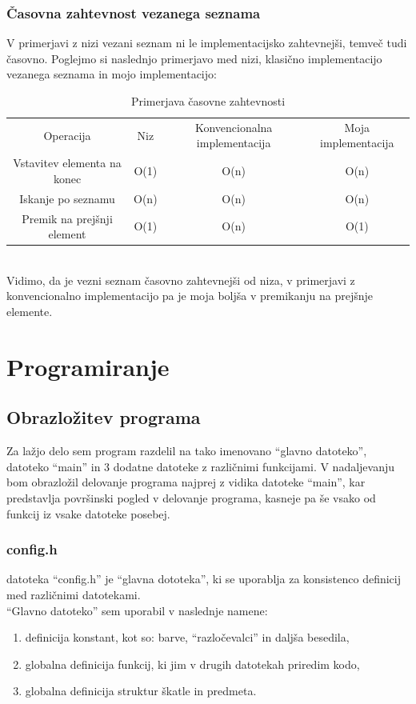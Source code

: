 \documentclass[12pt, a4paper, notitlepage]{article}
\begin{document}
    \subsubsection{Časovna zahtevnost vezanega seznama}
    V primerjavi z nizi vezani seznam ni le implementacijsko zahtevnejši, temveč tudi časovno. Poglejmo si naslednjo primerjavo med nizi, klasično implementacijo vezanega seznama in mojo implementacijo:
    \begin{table}[h!]
    \begin{center}
      \begin{tabular}{ |c|c|c|c| }
        Operacija & Niz & Konvencionalna implementacija & Moja implementacija\\
        Vstavitev elementa na konec & O(1) & O(n) & O(n)\\
        Iskanje po seznamu & O(n) & O(n) & O(n)\\
        Premik na prejšnji element & O(1) & O(n) &O(1)
      \end{tabular}
      \caption{Primerjava časovne zahtevnosti\cite{timecomp_linked_list}}
    \end{center}
    \end{table}
    \\Vidimo, da je vezni seznam časovno zahtevnejši od niza, v primerjavi z konvencionalno implementacijo pa je moja boljša v premikanju na prejšnje elemente.
  \section{Programiranje}
    \subsection{Obrazložitev programa}
    Za lažjo delo sem program razdelil na tako imenovano ``glavno datoteko'', datoteko ``main'' in 3 dodatne datoteke z različnimi funkcijami. V nadaljevanju bom obrazložil delovanje programa najprej z vidika datoteke ``main'', kar predstavlja površinski pogled v delovanje programa, kasneje pa še vsako od funkcij iz vsake datoteke posebej.
      \subsubsection{config.h}
      datoteka ``config.h'' je ``glavna dototeka'', ki se uporablja za konsistenco definicij med različnimi datotekami\cite{cpplang}.\\ ``Glavno datoteko'' sem uporabil v naslednje namene:
      \begin{enumerate}
        \item definicija konstant, kot so: barve, ``razločevalci'' in daljša besedila,
        \item globalna definicija funkcij, ki jim v drugih datotekah priredim kodo, 
        \item globalna definicija struktur škatle in predmeta.
      \end{enumerate}
\end{document}

